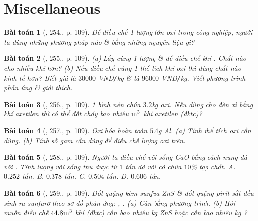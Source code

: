\documentclass{article}
\newtheorem{baitoan}{Bài toán}
\begin{document}

\section{Miscellaneous}

\begin{baitoan}[\cite{An_400_BT_Hoa_Hoc_8_2020}, 254., p. 109]
	Để điều chế 1 lượng lớn oxi trong công nghiệp, người ta dùng những phương pháp nào \& bằng những nguyên liệu gì?
\end{baitoan}

\begin{baitoan}[\cite{An_400_BT_Hoa_Hoc_8_2020}, 255., p. 109]
	(a) Lấy cùng 1 lượng \emph{} \& \emph{} để điều chế khí \emph{}. Chất nào cho nhiều khí \emph{} hơn? (b) Nếu điều chế cùng 1 thể tích khí oxi thì dùng chất nào kinh tế hơn? Biết giá \emph{} là $30000$ \emph{VND\texttt{/}kg} \& \emph{} là $96000$ \emph{VND\texttt{/}kg}. Viết phương trình phản ứng \& giải thích.
\end{baitoan}

\begin{baitoan}[\cite{An_400_BT_Hoa_Hoc_8_2020}, 256., p. 109]
	1 bình nén chứa $3.2$\emph{kg} oxi. Nếu dùng cho đèn xì bằng khí axetilen thì có thể đốt cháy bao nhiêu $\rm m^3$ khí axetilen (đktc)?
\end{baitoan}

\begin{baitoan}[\cite{An_400_BT_Hoa_Hoc_8_2020}, 257., p. 109]
	Oxi hóa hoàn toàn $5.4$\emph{g Al}. (a) Tính thể tích oxi cần dùng. (b) Tính số gam \emph{} cần dùng để điều chế lượng oxi trên.
\end{baitoan}

\begin{baitoan}[\cite{An_400_BT_Hoa_Hoc_8_2020}, 258., p. 109]
	Người ta điều chế vôi sống \emph{CaO} bằng cách nung đá vôi \emph{}. Tính lượng vôi sống thu được từ $1$ tấn đá vôi có chứa $10$\% tạp chất. {\sf A.} $0.252$ tấn. {\sf B.} $0.378$ tấn. {\sf C.} $0.504$ tấn. {\sf D.} $0.606$ tấn.
\end{baitoan}

\begin{baitoan}[\cite{An_400_BT_Hoa_Hoc_8_2020}, 259., p. 109]
	Đốt quặng kèm sunfua \emph{ZnS} \& đốt quặng pirit sắt \emph{} đều sinh ra sunfurơ \emph{} theo sơ đồ phản ứng: \emph{}, \emph{}. (a) Cân bằng phương trình. (b) Hỏi muốn điều chế $44.8\rm m^3$ khí \emph{} (đktc) cần bao nhiêu \emph{kg ZnS} hoặc cần bao nhiêu \emph{kg }?
\end{baitoan}
\end{document}
